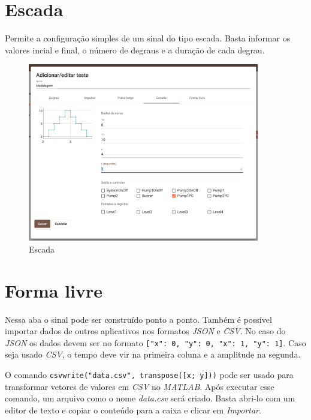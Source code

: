 \newpage{}
\section{Escada}%
\label{sec:stairs}

Permite a configuração simples de um sinal do tipo escada. Basta informar os
valores incial e final, o número de degraus e a duração de cada degrau.

\begin{figure}[ht!]
    \centering
    \includegraphics[width=0.9\textwidth]{imgs/system-response6}
    \caption[Escada]{Escada}%
    \label{fig:system-response6}
\end{figure}

\newpage{}
\section{Forma livre}%
\label{sec:free-form}

Nessa aba o sinal pode ser construído ponto a ponto. Também é possível importar
dados de outros aplicativos nos formatos \textit{JSON} e \textit{CSV}. No caso
do \textit{JSON} os dados devem ser no formato \texttt{[{"x": 0,
"y": 0}, {"x": 1, "y": 1}]}. Caso seja usado \textit{CSV}, o tempo deve vir na
primeira coluna e a amplitude na segunda.

O comando \texttt{csvwrite("data.csv", transpose([x; y]))} pode ser
usado para transformar vetores de valores em \textit{CSV} no \textit{MATLAB}.
Após executar esse comando, um arquivo como o nome \textit{data.csv} será
criado. Basta abri-lo com um editor de texto e copiar o conteúdo para a caixa e
clicar em \textit{Importar}.

